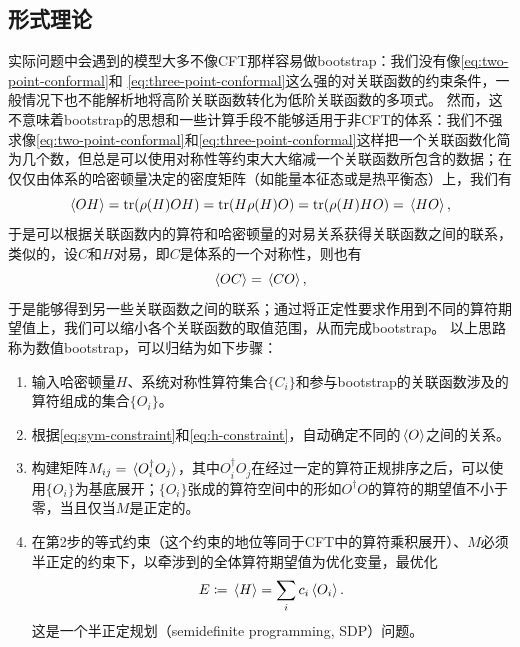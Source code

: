 \documentclass[oneside]{fduthesis}
\begin{document}
\subsection{形式理论}\label{sec:formalism}

实际问题中会遇到的模型大多不像CFT那样容易做bootstrap：我们没有像\eqref{eq:two-point-conformal}和
\eqref{eq:three-point-conformal}这么强的对关联函数的约束条件，一般情况下也不能解析地将高阶关联函数转化为低阶关联函数的多项式。
然而，这不意味着bootstrap的思想和一些计算手段不能够适用于非CFT的体系：我们不强求像\eqref{eq:two-point-conformal}和\eqref{eq:three-point-conformal}这样把一个关联函数化简为几个数，但总是可以使用对称性等约束大大缩减一个关联函数所包含的数据；在仅仅由体系的哈密顿量决定的密度矩阵（如能量本征态或是热平衡态）上，我们有
\begin{equation}
    \expval*{O H} = \trace (\rho(H) O H) = \trace(H \rho(H) O) = \trace(\rho(H) H O)  = \expval*{H {O}},
    \label{eq:h-constraint}
\end{equation}
于是可以根据关联函数内的算符和哈密顿量的对易关系获得关联函数之间的联系，类似的，设$C$和$H$对易，即$C$是体系的一个对称性，则也有
\begin{equation}
    \expval*{O C} = \expval*{C {O}},
    \label{eq:sym-constraint}
\end{equation}
于是能够得到另一些关联函数之间的联系；通过将正定性要求作用到不同的算符期望值上，我们可以缩小各个关联函数的取值范围，从而完成bootstrap。
以上思路称为数值bootstrap，可以归结为如下步骤：
\begin{enumerate}
  \item 输入哈密顿量$H$、系统对称性算符集合$\{C_i\}$和参与bootstrap的关联函数涉及的算符组成的集合$\{O_i\}$。
  \item 根据\eqref{eq:sym-constraint}和\eqref{eq:h-constraint}，自动确定不同的$\expval*{O}$之间的关系。
  \item 构建矩阵$M_{ij} = \expval*{O_i^\dagger O_j}$，其中$O_i^\dagger O_j$在经过一定的算符正规排序之后，可以使用$\{O_i\}$为基底展开；$\{O_i\}$张成的算符空间中的形如$O^\dagger O$的算符的期望值不小于零，当且仅当$M$是正定的。
  \item 在第2步的等式约束（这个约束的地位等同于CFT中的算符乘积展开）、$M$必须半正定的约束下，以牵涉到的全体算符期望值为优化变量，最优化
  \begin{equation}
      E \coloneqq \expval*{H} = \sum_i c_i \expval*{O_i}.
      \label{eq:target-function}
  \end{equation}
  这是一个半正定规划（semidefinite programming, SDP）问题。
\end{enumerate}
\end{document}
